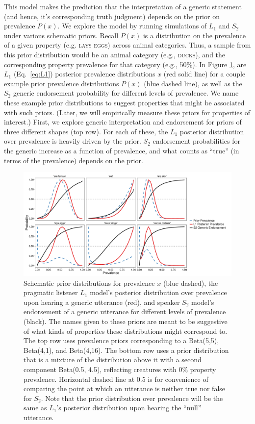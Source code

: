 \documentclass[12pt,letterpaper]{article}
\begin{document}
This model makes the prediction that the interpretation of a generic statement (and hence, it's corresponding truth judgment) depends on the prior on prevalence $P(x)$.
We explore the model by running simulations of $L_1$ and $S_2$ under various schematic priors.
Recall $P(x)$ is a distribution on the prevalence of a given property (e.g. \textsc{lays eggs}) across animal categories. 
Thus, a sample from this prior distribution would be an animal category (e.g., \textsc{ducks}), and the corresponding property prevalence for that category (e.g., 50\%).
In Figure \ref{fig:schematic-unif}, are $L_1$ (Eq.~\ref{eq:L1}) posterior prevalence distributions $x$ (red solid line) for a couple example prior prevalence distributions $P(x)$ (blue dashed line), as well as the $S_2$ generic endorsement probability for different levels of prevalence.
We name these example prior distributions to suggest properties that might be associated with such priors. 
(Later, we will empirically measure these priors for properties of interest.)
First, we explore generic interpretation and endorsement for priors of three different shapes (top row). 
For each of these, the $L_1$ posterior distribution over prevalence is heavily driven by the prior.
$S_2$ endorsement probabilities for the generic increase as a function of prevalence, and what counts as ``true'' (in terms of the prevalence) depends on the prior. 

\begin{figure}
\centering
    \includegraphics[width=\columnwidth]{schematics_s2.pdf}
    \caption{Schematic prior distributions for prevalence $x$ (blue dashed), the pragmatic listener $L_1$ model's posterior distribution over prevalence upon hearing a generic utterance (red), and speaker $S_2$ model's endorsement of a generic utterance for different levels of prevalence (black).
    The names given to these priors are meant to be suggestive of what kinds of properties these distributions might correspond to.
    The top row uses prevalence priors corresponding to a Beta(5,5), Beta(4,1), and Beta(4,16).
      The bottom row uses a prior distribution that is a mixture of the distribution above it with a second component Beta(0.5, 4.5), reflecting creatures with 0\% property prevalence.
    Horizontal dashed line at 0.5 is for convenience of comparing the point at which an utterance is neither true nor false for $S_2$.
	Note that the prior distribution over prevalence will be the same as $L_1$'s posterior distribution upon hearing the ``null'' utterance.
    }
  \label{fig:schematic-unif}
\end{figure}
\end{document}
